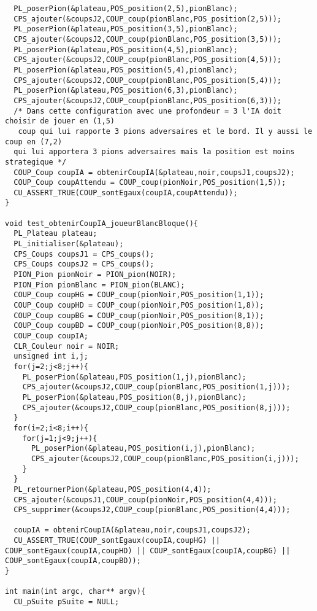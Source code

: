 \begin{lstlisting}
  PL_poserPion(&plateau,POS_position(2,5),pionBlanc);
  CPS_ajouter(&coupsJ2,COUP_coup(pionBlanc,POS_position(2,5)));
  PL_poserPion(&plateau,POS_position(3,5),pionBlanc);
  CPS_ajouter(&coupsJ2,COUP_coup(pionBlanc,POS_position(3,5)));
  PL_poserPion(&plateau,POS_position(4,5),pionBlanc);
  CPS_ajouter(&coupsJ2,COUP_coup(pionBlanc,POS_position(4,5)));
  PL_poserPion(&plateau,POS_position(5,4),pionBlanc);
  CPS_ajouter(&coupsJ2,COUP_coup(pionBlanc,POS_position(5,4)));
  PL_poserPion(&plateau,POS_position(6,3),pionBlanc);
  CPS_ajouter(&coupsJ2,COUP_coup(pionBlanc,POS_position(6,3)));
  /* Dans cette configuration avec une profondeur = 3 l'IA doit choisir de jouer en (1,5)
   coup qui lui rapporte 3 pions adversaires et le bord. Il y aussi le coup en (7,2) 
  qui lui apportera 3 pions adversaires mais la position est moins strategique */
  COUP_Coup coupIA = obtenirCoupIA(&plateau,noir,coupsJ1,coupsJ2);
  COUP_Coup coupAttendu = COUP_coup(pionNoir,POS_position(1,5));
  CU_ASSERT_TRUE(COUP_sontEgaux(coupIA,coupAttendu));
}

void test_obtenirCoupIA_joueurBlancBloque(){
  PL_Plateau plateau;
  PL_initialiser(&plateau);
  CPS_Coups coupsJ1 = CPS_coups();
  CPS_Coups coupsJ2 = CPS_coups();
  PION_Pion pionNoir = PION_pion(NOIR);
  PION_Pion pionBlanc = PION_pion(BLANC);
  COUP_Coup coupHG = COUP_coup(pionNoir,POS_position(1,1));
  COUP_Coup coupHD = COUP_coup(pionNoir,POS_position(1,8));
  COUP_Coup coupBG = COUP_coup(pionNoir,POS_position(8,1));
  COUP_Coup coupBD = COUP_coup(pionNoir,POS_position(8,8));
  COUP_Coup coupIA;
  CLR_Couleur noir = NOIR;
  unsigned int i,j;
  for(j=2;j<8;j++){
    PL_poserPion(&plateau,POS_position(1,j),pionBlanc);
    CPS_ajouter(&coupsJ2,COUP_coup(pionBlanc,POS_position(1,j)));
    PL_poserPion(&plateau,POS_position(8,j),pionBlanc);
    CPS_ajouter(&coupsJ2,COUP_coup(pionBlanc,POS_position(8,j)));
  }
  for(i=2;i<8;i++){
    for(j=1;j<9;j++){
      PL_poserPion(&plateau,POS_position(i,j),pionBlanc);
      CPS_ajouter(&coupsJ2,COUP_coup(pionBlanc,POS_position(i,j)));
    }
  }
  PL_retournerPion(&plateau,POS_position(4,4));
  CPS_ajouter(&coupsJ1,COUP_coup(pionNoir,POS_position(4,4)));
  CPS_supprimer(&coupsJ2,COUP_coup(pionBlanc,POS_position(4,4)));
  
  coupIA = obtenirCoupIA(&plateau,noir,coupsJ1,coupsJ2);
  CU_ASSERT_TRUE(COUP_sontEgaux(coupIA,coupHG) || COUP_sontEgaux(coupIA,coupHD) || COUP_sontEgaux(coupIA,coupBG) || COUP_sontEgaux(coupIA,coupBD));
}

int main(int argc, char** argv){
  CU_pSuite pSuite = NULL;


\end{lstlisting}
